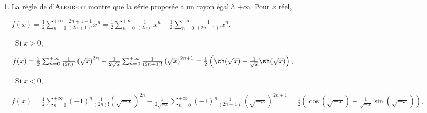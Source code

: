 {{\begin{enumerate}
\begin{center}
\shadowbox{
$\forall x\in]-1,1[$, $\sum_{n=0}^{+\infty}\frac{x^n}{2n+1}=\left\{
\begin{array}{l}
\frac{\Argth(\sqrt{x})}{\sqrt{x}}\;\text{si}\;x\in]0,1[\\
\rule[-2mm]{0mm}{4mm}1\;\text{si}\;x=0\\
\frac{\Arctan(\sqrt{-x})}{\sqrt{-x}}\;\text{si}\;x\in]-1,0[
\end{array}
\right.$.
}
\end{center}

\item  La règle de d'\textsc{Alembert} montre que la série proposée a un rayon égal à $+\infty$. Pour $x$ réel, 

\begin{center}
$f(x) =\frac{1}{2}\sum_{n=0}^{+\infty}\frac{2n+1-1}{(2n+1)!}x^n=\frac{1}{2}\sum_{n=0}^{+\infty}\frac{1}{(2n)!}x^n-\frac{1}{2}\sum_{n=0}^{+\infty}\frac{1}{(2n+1)!}x^n$.
\end{center}

\textbullet~Si $x > 0$,  

\begin{center}
$f(x) =\frac{1}{2}\sum_{n=0}^{+\infty}\frac{1}{(2n)!}\left(\sqrt{x}\right)^{2n}-\frac{1}{2\sqrt{x}}\sum_{n=0}^{+\infty}\frac{1}{(2n+1)!}\left(\sqrt{x}\right)^{2n+1}=\frac{1}{2}\left(\ch(\sqrt{x})-\frac{1}{\sqrt{x}}\sh(\sqrt{x})\right)$.
\end{center}

\textbullet~Si $x<0$,  

\begin{center}
$f(x) =\frac{1}{2}\sum_{n=0}^{+\infty}(-1)^n\frac{1}{(2n)!}\left(\sqrt{-x}\right)^{2n}-\frac{1}{2\sqrt{-x}}\sum_{n=0}^{+\infty}(-1)^n\frac{1}{(2n+1)!}\left(\sqrt{-x}\right)^{2n+1}=\frac{1}{2}\left(\cos(\sqrt{-x})-\frac{1}{\sqrt{-x}}\sin(\sqrt{-x})\right)$.
\end{center}

\begin{center}
\end{center}


\end{enumerate}}}
